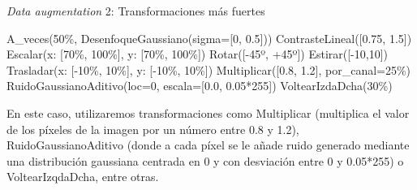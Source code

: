 
\begin{algorithm}[H]
    \caption{\textit{Data augmentation} 2: Transformaciones más fuertes}
\begin{algorithmic}[1]
    \State A\_veces(50\%, DesenfoqueGaussiano(sigma=[0, 0.5]))
    \State ContrasteLineal([0.75, 1.5])
    \State Escalar(x: [70\%, 100\%], y: [70\%, 100\%])
    \State Rotar([-45º, +45º])
    \State Estirar([-10,10])
    \State Trasladar(x: [-10\%, 10\%], y: [-10\%, 10\%])
    \State Multiplicar([0.8, 1.2], por\_canal=25\%)
    \State RuidoGaussianoAditivo(loc=0, escala=[0.0, 0.05*255])
    \State VoltearIzdaDcha(30\%)
\end{algorithmic}
\end{algorithm}

En este caso, utilizaremos transformaciones como Multiplicar (multiplica el valor de los píxeles de la imagen por un número entre 0.8 y 1.2), RuidoGaussianoAditivo (donde a cada píxel se le añade ruido generado mediante una distribución gaussiana centrada en 0 y con desviación entre 0 y 0.05*255) o VoltearIzqdaDcha, entre otras.






